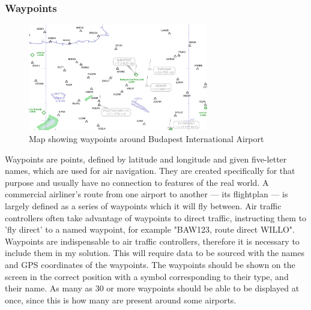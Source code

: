 \documentclass{article}
\begin{document}
\subsubsection{Waypoints}
\begin{figure}[H]
\centering
\includegraphics[width=0.7\textwidth]{context/budapest.png}
\caption{\label{fig:budapest}Map showing waypoints around Budapest International Airport}
\end{figure}
Waypoints are points, defined by latitude and longitude and given five-letter names, which are used for air navigation.
They are created specifically for that purpose and usually have no connection to features of the real world\cite{waypoint}.
A commercial airliner's route from one airport to another --- its flightplan --- is largely defined as a series of waypoints which it will fly between.
Air traffic controllers often take advantage of waypoints to direct traffic, instructing them to 'fly direct' to a named waypoint, for example "BAW123, route direct WILLO".
Waypoints are indispensable to air traffic controllers, therefore it is necessary to include them in my solution.
This will require data to be sourced with the names and GPS coordinates of the waypoints.
The waypoints should be shown on the screen in the correct position with a symbol corresponding to their type, and their name.
As many as 30 or more waypoints should be able to be displayed at once, since this is how many are present around some airports.


\end{document}
